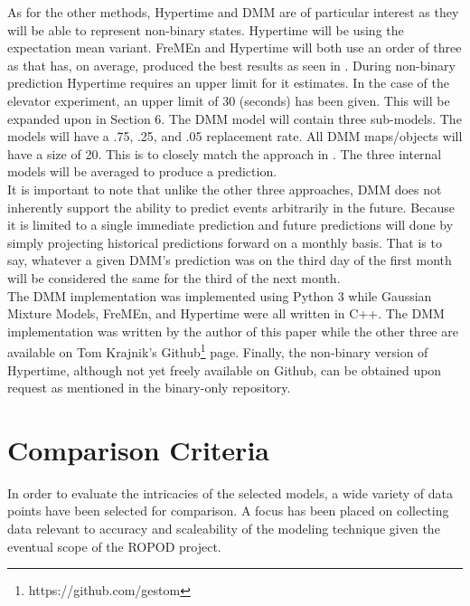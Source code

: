   As for the other methods, Hypertime and DMM are of particular interest as they will
  be able to represent non-binary states. Hypertime will be using the
  expectation mean variant.  FreMEn and
  Hypertime will both use an order of three as that has, on average, produced
  the best results as seen in \cite{Krajnik2015}. During
  non-binary prediction Hypertime requires an upper limit for it estimates. In
  the case of the elevator experiment, an upper limit of 30 (seconds) has been
  given. This will be expanded upon in Section 6. The DMM model will
  contain three sub-models. The models will have a .75, .25, and
  .05 replacement rate. All DMM maps/objects will have a size of 20. This is to closely match
  the approach in \cite{Biber2005}. The three internal models will be averaged
  to produce a prediction.\\

  It is important to note that unlike the other three approaches, DMM does
  not inherently support the ability to predict events arbitrarily in the future.
  Because it is limited to a single immediate prediction and future predictions
  will done by simply projecting historical predictions forward on a monthly basis.
  That is to say, whatever a given DMM's prediction was on the third day of the first month
  will be considered the same for the third of the next month. \\

  The DMM implementation was implemented using Python 3 while Gaussian Mixture
  Models, FreMEn, and Hypertime were all written in C++. The DMM implementation
  was written by the author of this paper while the other three
  are available on Tom Krajnik's Github\footnote[1]{https://github.com/gestom} page.
  Finally, the non-binary
  version of Hypertime, although not yet freely available on Github, can
  be obtained upon request as mentioned in the binary-only repository. \\




  \section{ Comparison Criteria }
  In order to evaluate the intricacies of the selected models, a wide variety
  of data points have been selected for comparison. A focus has been placed on
  collecting data relevant to accuracy and scaleability of the modeling
  technique given the eventual scope of the ROPOD project. \\

